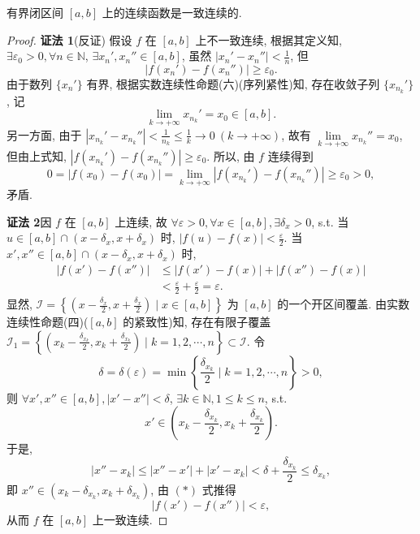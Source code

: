 \begin{theorem}[Cantor 定理]\label{thm:2.5.5}
有界闭区间 $[a,b]$ 上的连续函数是一致连续的.
\end{theorem}

\begin{proof}
\textbf{证法 1}\quad (反证) 假设 $f$ 在 $[a,b]$ 上不一致连续, 根据其定义知, $\exists \varepsilon_0 > 0, \forall n \in \mathbb{N}$, $\exists x_n', x_n'' \in [a,b]$, 虽然 $|x_n' - x_n''| < \frac{1}{n}$, 但
\[
|f(x_n') - f(x_n'')| \geqslant \varepsilon_0.
\]
由于数列 $\{x_n'\}$ 有界, 根据实数连续性命题(六)(序列紧性)知, 存在收敛子列 $\{x_{n_k}'\}$, 记
\[
\lim_{k \to +\infty} x_{n_k}' = x_0 \in [a,b].
\]
另一方面, 由于 $|x_{n_k}' - x_{n_k}''| < \frac{1}{n_k} \leqslant \frac{1}{k} \to 0\ (k \to +\infty)$, 故有 $\lim\limits_{k \to +\infty} x_{n_k}'' = x_0$, 但由上式知, $|f(x_{n_k}') - f(x_{n_k}'')| \geqslant \varepsilon_0$. 所以, 由 $f$ 连续得到
\[
0 = |f(x_0) - f(x_0)| = \lim_{k \to +\infty} |f(x_{n_k}') - f(x_{n_k}'')| \geqslant \varepsilon_0 > 0,
\]
矛盾.

\textbf{证法 2}\quad 因 $f$ 在 $[a,b]$ 上连续, 故 $\forall \varepsilon > 0, \forall x \in [a,b], \exists \delta_x > 0$, s.t. 当 $u \in [a,b] \cap (x - \delta_x, x + \delta_x)$ 时, $|f(u) - f(x)| < \frac{\varepsilon}{2}$. 当 $x', x'' \in [a,b] \cap (x - \delta_x, x + \delta_x)$ 时,
\[
\begin{aligned}
|f(x') - f(x'')| &\leqslant |f(x') - f(x)| + |f(x'') - f(x)| \\
&< \frac{\varepsilon}{2} + \frac{\varepsilon}{2} = \varepsilon.
\end{aligned}
\tag*{(*)}
\]
显然, $\mathcal{I} = \left\{\left(x - \frac{\delta_x}{2}, x + \frac{\delta_x}{2}\right) \mid x \in [a,b]\right\}$ 为 $[a,b]$ 的一个开区间覆盖. 由实数连续性命题(四)($[a,b]$ 的紧致性)知, 存在有限子覆盖 $\mathcal{I}_1 = \left\{\left(x_k - \frac{\delta_{x_k}}{2}, x_k + \frac{\delta_{x_k}}{2}\right) \mid k = 1, 2, \cdots, n\right\} \subset \mathcal{I}$. 令
\[
\delta = \delta(\varepsilon) = \min\left\{\frac{\delta_{x_k}}{2} \mid k = 1, 2, \cdots, n\right\} > 0,
\]
则 $\forall x', x'' \in [a,b], |x' - x''| < \delta$, $\exists k \in \mathbb{N}, 1 \leqslant k \leqslant n$, s.t.
\[
x' \in \left(x_k - \frac{\delta_{x_k}}{2}, x_k + \frac{\delta_{x_k}}{2}\right).
\]
于是,
\[
|x'' - x_k| \leqslant |x'' - x'| + |x' - x_k| < \delta + \frac{\delta_{x_k}}{2} \leqslant \delta_{x_k},
\]
即 $x'' \in (x_k - \delta_{x_k}, x_k + \delta_{x_k})$, 由 $(*)$ 式推得
\[
|f(x') - f(x'')| < \varepsilon,
\]
从而 $f$ 在 $[a,b]$ 上一致连续.


\end{proof}
